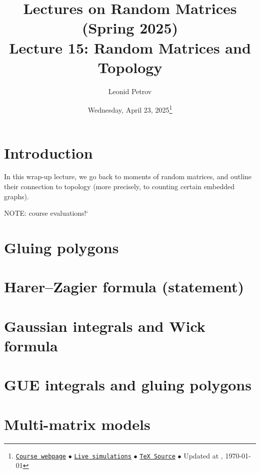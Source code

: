 \documentclass[letterpaper,11pt,oneside,reqno]{article}
\numberwithin{equation}{section}
\theoremstyle{definition}
\begin{document}
\title{Lectures on Random Matrices
(Spring 2025)
\\Lecture 15: Random Matrices and Topology}


\date{Wednesday, April 23, 2025\footnote{\href{https://lpetrov.cc/rmt25/}{\texttt{Course webpage}}
$\bullet$ \href{https://lpetrov.cc/simulations/model/random-matrices/}{\texttt{Live simulations}}
$\bullet$ \href{https://lpetrov.cc/rmt25/rmt25-notes/rmt2025-l15.tex}{\texttt{TeX Source}}
$\bullet$
Updated at \currenttime, \today}}



\author{Leonid Petrov}


\maketitle
\tableofcontents


\section{Introduction}

In this wrap-up lecture, we go back to moments of random
matrices, and outline their connection to topology
(more precisely, to counting certain embedded graphs).

\bigskip
\huge{NOTE: course evaluations!}`

\section{Gluing polygons}








\section{Harer–Zagier formula (statement)}


\section{Gaussian integrals and Wick formula}



\section{GUE integrals and gluing polygons}




\section{Multi-matrix models}
\end{document}
